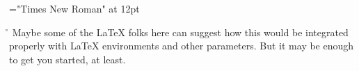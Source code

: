 \font\uc="Times New Roman" at 12pt
 \r\n
\uc Maybe some of the LaTeX folks here can suggest how this would be integrated properly with LaTeX environments and other parameters. But it may be enough to get you started, at least. 


\bye
